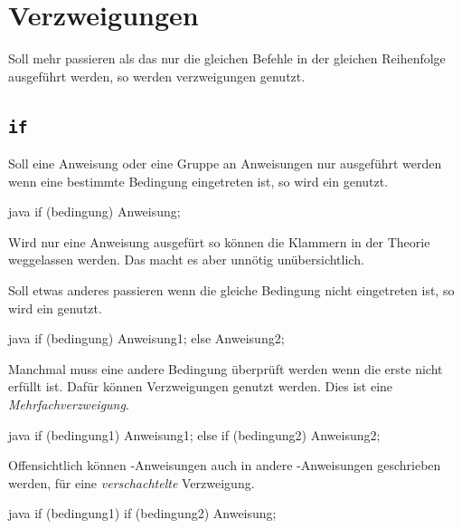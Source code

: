 \documentclass{article}
\begin{document}
\section{Verzweigungen}
Soll mehr passieren als das nur die gleichen Befehle in der gleichen Reihenfolge ausgeführt werden, so werden verzweigungen genutzt.

\subsection{\texttt{if}}
Soll eine Anweisung oder eine Gruppe an Anweisungen nur ausgeführt werden wenn eine bestimmte Bedingung eingetreten ist, so wird ein  genutzt.
\begin{sourcecode}{java}
if (bedingung) {
    Anweisung;
}
\end{sourcecode}
Wird nur eine Anweisung ausgefürt so können die Klammern in der Theorie weggelassen werden. Das macht es aber unnötig unübersichtlich.

Soll etwas anderes passieren wenn die gleiche Bedingung nicht eingetreten ist, so wird ein  genutzt.
\begin{sourcecode}{java}
if (bedingung) {
    Anweisung1;
} else {
    Anweisung2;
}
\end{sourcecode}
Manchmal muss eine andere Bedingung überprüft werden wenn die erste nicht erfüllt ist. Dafür können  Verzweigungen genutzt werden. Dies ist eine \emph{Mehrfachverzweigung}.
\begin{sourcecode}{java}
if (bedingung1) {
    Anweisung1;
} else if (bedingung2) {
    Anweisung2;
}
\end{sourcecode}
Offensichtlich können -Anweisungen auch in andere -Anweisungen geschrieben werden, für eine \emph{verschachtelte} Verzweigung.
\begin{sourcecode}{java}
if (bedingung1) {
    if (bedingung2) {
        Anweisung;
    }
}
\end{sourcecode}
\end{document}
